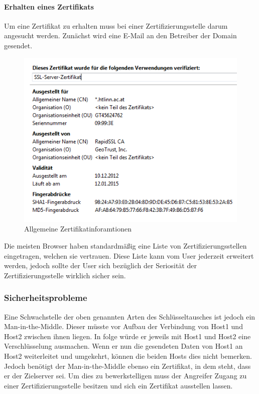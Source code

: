 \paragraph{Erhalten eines Zertifikats}
Um eine Zertifikat zu erhalten muss bei einer Zertifizierungsstelle darum angesucht werden. Zunächst wird eine E-Mail an den Betreiber der Domain gesendet.
\begin{figure}[H]
\centering
\includegraphics[keepaspectratio=true, width=12cm]{images/screenshots/certificate.png}
\caption{Allgemeine Zertifikatinforamtionen}
\label{fig:certificate}
\end{figure}
Die meisten Browser haben standardmäßig eine Liste von Zertifizierungsstellen eingetragen, welchen sie vertrauen. Diese Liste kann vom User jederzeit erweitert werden, jedoch sollte der User sich bezüglich der Seriosität der Zertifizierungsstelle wirklich sicher sein. 

\subsubsection{Sicherheitsprobleme}
Eine Schwachstelle der oben genannten Arten des Schlüsseltausches ist jedoch ein Man-in-the-Middle. Dieser müsste vor Aufbau der Verbindung von Host1 und Host2 zwischen ihnen liegen. In folge würde er jeweils mit Host1 und Host2 eine Verschlüsselung ausmachen. Wenn er nun die gesendeten Daten von Host1 an Host2 weiterleitet und umgekehrt, können die beiden Hosts dies nicht bemerken.\\
Jedoch benötigt der Man-in-the-Middle ebenso ein Zertifikat, in dem steht, dass er der Zielserver sei. Um dies zu bewerkstelligen muss der Angreifer Zugang zu einer Zertifizierungsstelle besitzen und sich ein Zertifikat ausstellen lassen.